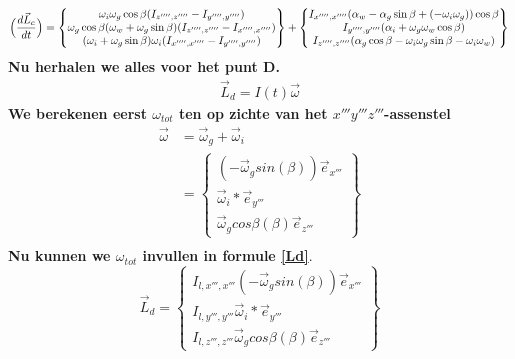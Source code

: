 \documentclass[a4paper,10pt]{article}
\begin{document}
\begin{equation}
\Big(\dfrac{d\vec{L}_c}{dt}\Big) = \begin{Bmatrix}
\omega_i\omega_g\cos{\beta}(I_{z'''',z''''}-I_{y'''',y''''})\\
\omega_g\cos{\beta}(\omega_w + \omega_g\sin{\beta})(I_{z'''',z''''}-I_{x'''',x''''})\\
(\omega_i + \omega_g \sin{\beta})\omega_i( I_{x'''',x''''}-I_{y'''',y''''})
\end{Bmatrix}
+ \begin{Bmatrix}
I_{x'''',x''''}(\alpha_w - \alpha_g \sin{\beta}+ (-\omega_i\omega_g))\cos{\beta}\\
I_{y'''',y''''}(\alpha_i + \omega_g\omega_w\cos{\beta})\\
I_{z'''',z''''}(\alpha_g\cos{\beta}- \omega_i\omega_g\sin{\beta}-\omega_i\omega_w)
\end{Bmatrix}\\
\end{equation}
\textbf{Nu herhalen we alles voor het punt D.}
\begin{equation}
\label{Ld}
\begin{aligned}
\vec{L}_d = I(t)\vec{\omega}
\end{aligned}
\end{equation}
\textbf{We berekenen eerst $\omega_{tot}$ ten op zichte van het $x'''y'''z'''$-assenstel}
\begin{equation}
\begin{aligned}
\vec{\omega} &=  \vec{\omega}_g + \vec{\omega}_i\\
&= \begin{Bmatrix}
( -\vec{\omega}_g sin(\beta))\vec{e}_{x'''}\\
\vec{\omega}_i*\vec{e}_{y'''}\\
\vec{\omega}_g cos{\beta}(\beta)\vec{e}_{z'''}
\end{Bmatrix}\\
\end{aligned}
\end{equation}
\textbf{Nu kunnen we $\omega_{tot}$ invullen in formule \eqref{Ld}}.
\begin{equation}
\vec{L}_d=\begin{Bmatrix}
I_{l,x''',x'''} ( -\vec{\omega}_g sin(\beta))\vec{e}_{x'''}\\
I_{l,y''',y'''}\vec{\omega}_i*\vec{e}_{y'''}\\
I_{l,z''',z'''}\vec{\omega}_g cos{\beta}(\beta)\vec{e}_{z'''}
\end{Bmatrix}
\end{equation}
\end{document}
